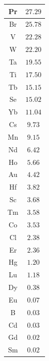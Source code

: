 \documentclass[11pt]{article}
\begin{document}
\begin{table}[ht]
\begin{tabular}{| c | c |}
    Pr               &   $27.29$ \\ \hline
    Br               &   $25.78$ \\ \hline
    V                &   $22.28$ \\ \hline
    W                &   $22.20$ \\ \hline
    Ta               &   $19.55$ \\ \hline
    Ti               &   $17.50$ \\ \hline
    Tb               &   $15.15$ \\ \hline
    Se               &   $15.02$ \\ \hline
    Yb               &   $11.04$ \\ \hline
    Cs               &    $9.73$ \\ \hline
    Mn               &    $9.15$ \\ \hline
    Nd               &    $6.42$ \\ \hline
    Ho               &    $5.66$ \\ \hline
    Au               &    $4.42$ \\ \hline
    Hf               &    $3.82$ \\ \hline
    Sc               &    $3.68$ \\ \hline
    Tm               &    $3.58$ \\ \hline
    Co               &    $3.53$ \\ \hline
    Cl               &    $2.38$ \\ \hline
    Er               &    $2.36$ \\ \hline
    Hg               &    $1.20$ \\ \hline
    Lu               &    $1.18$ \\ \hline
    Dy               &    $0.38$ \\ \hline
    Eu               &    $0.07$ \\ \hline
    B                &    $0.03$ \\ \hline
    Cd               &    $0.03$ \\ \hline
    Gd               &    $0.02$ \\ \hline
    Sm               &    $0.02$ \\ \hline
    \end{tabular}
\end{table}
\end{document}
